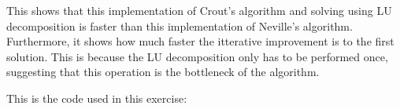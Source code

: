 

\noindent
This shows that this implementation of Crout's algorithm and solving using
LU decomposition is faster than this implementation of Neville's algorithm.
Furthermore, it shows how much faster the itterative improvement is 
to the first solution. This is because the LU decomposition only has to be
performed once, suggesting that this operation is the bottleneck of the 
algorithm.

\noindent
This is the code used in this exercise:
